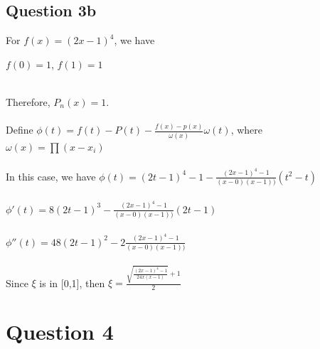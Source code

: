 \documentclass[11pt]{article} %
\begin{document}
\subsection{Question 3b}
For $f(x) = (2x-1)^{4}$, we have\\
\centerline{$f(0)=1$, $f(1)=1$}\\
Therefore, $P_{n}(x)=1$.\\\\
Define $\phi(t) = f(t)-P(t)-\frac{f(x)-p(x)}{\omega(x)}\omega(t)$, where $\omega(x) = \prod(x-x_{i})$\\\\
In this case, we have $\phi(t) = (2t-1)^{4}-1-\frac{(2x-1)^{4}-1}{(x-0)(x-1))}(t^{2}-t)$\\\\
$\phi'(t) = 8(2t-1)^{3}-\frac{(2x-1)^{4}-1}{(x-0)(x-1))}(2t-1)$\\\\
$\phi''(t) = 48(2t-1)^{2}-2\frac{(2x-1)^{4}-1}{(x-0)(x-1))}$\\\\
Since $\xi$ is in [0,1], then $\xi = \frac{\sqrt{\frac{(2x-1)^{4}-1}{24x(x-1)}}+1}{2}$

\section{Question 4}
\end{document}
